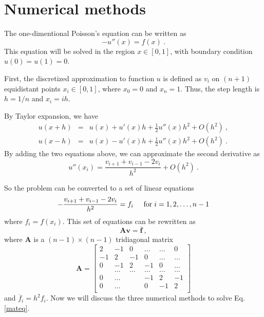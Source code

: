 \documentclass{article}
\begin{document}
	\section{Numerical methods}\label{method}
	The one-dimentional Poisson's equation can be written as
	\begin{equation}\label{diff}
	-u''(x) = f(x)\ .
	\end{equation}
	This equation will be solved in the region $x \in [0,1]$, 
	with boundary condition $u(0)=u(1)=0$. 
	\par
	First, the discretized approximation to function $u$ is defined as $v_i$ 
	on $(n+1)$ equidistant points $x_i \in [0,1]$, 
	where $x_0=0$ and $x_n=1$. Thus, the step length is $h=1/n$ and $x_i=ih$. 
	\par
	By Taylor expansion, we have
	\begin{eqnarray}
	u(x+h)&=&u(x)+u'(x)h+\frac{1}{2}u''(x)h^2+O(h^2)\ ,
	\\
	u(x-h)&=&u(x)-u'(x)h+\frac{1}{2}u''(x)h^2+O(h^2)\ .
	\end{eqnarray}
	By adding the two equations above, we can approximate the second derivative as
	\begin{equation}
	u''(x_i)=\frac{v_{i+1}+v_{i-1}-2v_i}{h^2}+O(h^2)\ .
	\end{equation}
	\par
	So the problem can be converted to a set of linear equations
	\begin{equation}
	-\frac{v_{i+1}+v_{i-1}-2v_i}{h^2} = f_i  \hspace{0.5cm} \mathrm{for} \hspace{0.1cm} i=1,2, \dots, n-1
	\end{equation}
	where $f_i=f(x_i)$. 
	This set of equations can be rewritten as 
	\begin{equation}\label{mateq}
	\mathbf{A}\mathbf{v} = \overline{\mathbf{f}}\ ,
	\end{equation}
	where $\mathbf{A}$ is a $(n-1) \times (n-1)$  tridiagonal matrix 
	\begin{equation}\label{matA}
	\mathbf{A} = \begin{bmatrix}
	2& -1& 0 &\dots   & \dots &0 \\
	-1 & 2 & -1 &0 &\dots &\dots \\
	0&-1 &2 & -1 & 0 & \dots \\
	& \dots   & \dots &\dots   &\dots & \dots \\
	0&\dots   &  &-1 &2& -1 \\
	0&\dots    &  & 0  &-1 & 2 \\
	\end{bmatrix}
	\end{equation}
	and $\overline{f}_i=h^2f_i$.
	Now we will discuss the three numerical methods to solve Eq. \ref{mateq}. 
\end{document}
